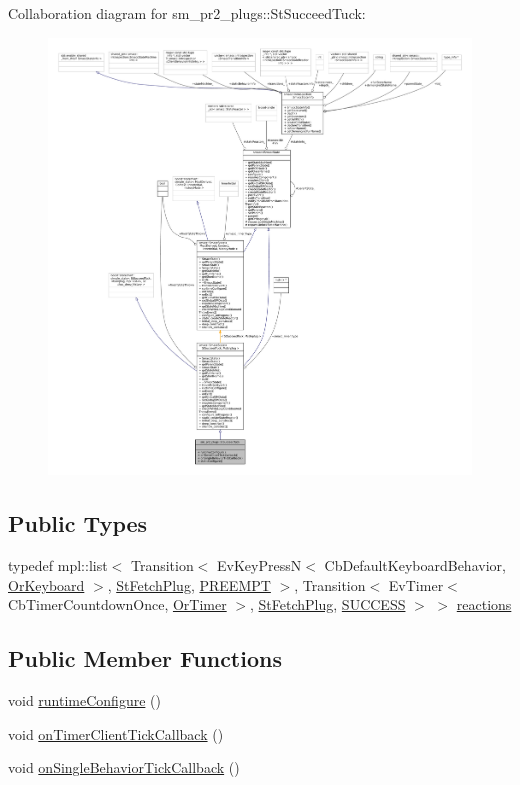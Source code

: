 Collaboration diagram for sm\+\_\+pr2\+\_\+plugs\+:\+:St\+Succeed\+Tuck\+:
\nopagebreak
\begin{figure}[H]
\begin{center}
\leavevmode
\includegraphics[width=350pt]{structsm__pr2__plugs_1_1StSucceedTuck__coll__graph}
\end{center}
\end{figure}
\subsection*{Public Types}
\begin{DoxyCompactItemize}
\item 
typedef mpl\+::list$<$ Transition$<$ Ev\+Key\+PressN$<$ Cb\+Default\+Keyboard\+Behavior, \hyperlink{classsm__pr2__plugs_1_1OrKeyboard}{Or\+Keyboard} $>$, \hyperlink{structsm__pr2__plugs_1_1StFetchPlug}{St\+Fetch\+Plug}, \hyperlink{classPREEMPT}{P\+R\+E\+E\+M\+PT} $>$, Transition$<$ Ev\+Timer$<$ Cb\+Timer\+Countdown\+Once, \hyperlink{classsm__pr2__plugs_1_1OrTimer}{Or\+Timer} $>$, \hyperlink{structsm__pr2__plugs_1_1StFetchPlug}{St\+Fetch\+Plug}, \hyperlink{classSUCCESS}{S\+U\+C\+C\+E\+SS} $>$ $>$ \hyperlink{structsm__pr2__plugs_1_1StSucceedTuck_a5f4cdc033699ffd5e4c7f36e690d245a}{reactions}
\end{DoxyCompactItemize}
\subsection*{Public Member Functions}
\begin{DoxyCompactItemize}
\item 
void \hyperlink{structsm__pr2__plugs_1_1StSucceedTuck_a1cdbe59c4fb6a107b2886745c13e6bc1}{runtime\+Configure} ()
\item 
void \hyperlink{structsm__pr2__plugs_1_1StSucceedTuck_af9f7556acf968aaa20d4e3eafda7f3ef}{on\+Timer\+Client\+Tick\+Callback} ()
\item 
void \hyperlink{structsm__pr2__plugs_1_1StSucceedTuck_a2f78ac55b1c5431bfdd20f20c5030815}{on\+Single\+Behavior\+Tick\+Callback} ()
\end{DoxyCompactItemize}
